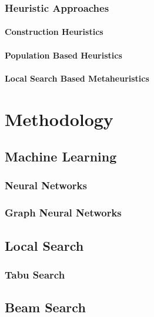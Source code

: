 \documentclass[draft,final]{vutinfth} %
\begin{document}

\subsection{Heuristic Approaches}

\subsubsection{Construction Heuristics}

\subsubsection{Population Based Heuristics}

\subsubsection{Local Search Based Metaheuristics}

\chapter{Methodology}

\section{Machine Learning}

\subsection{Neural Networks}

\subsection{Graph Neural Networks}

\section{Local Search}

\subsection{Tabu Search}

\section{Beam Search}
\end{document}
